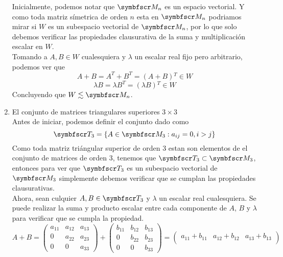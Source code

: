 \begin{enumerate}[label=\listAlph]
            Inicialmente, podemos notar que \(\fm_n\) es un espacio vectorial.
            Y como toda matriz símetrica de orden \(n\) esta en \(\fm_n\) 
            podriamos mirar si \(W\) es un subespacio vectorial de \(\fm_n\), 
            por lo que solo debemos verificar las propiedades clausurativa de la suma y multiplicación escalar en \(W\). \\
            Tomando a \(A, B \in W\) cualesquiera y \(\lambda\) un escalar real fijo pero arbitrario, podemos ver que 
            \[
                A + B = A^T + B^T = \left(A + B\right){}^T \in W
            \]
            \[
                \lambda B = \lambda B^T = \left(\lambda B\right){}^T \in W
            \]
            Concluyendo que \(W \lesssim \fm_n\).
        \item El conjunto de matrices triangulares superiores \(3 \times 3\) \\
            Antes de iniciar, podemos definir el conjunto dado como
            \[
                \ft_3 = \left\{A \in \fm_3: a_{ij} = 0, i > j\right\}
            \]
            Como toda matriz triángular superior de orden 3 estan son elementos de el conjunto de matrices de orden 3, 
            tenemos que \(\ft_3 \subset \fm_3\), entonces para ver que \(\ft_3\) es un subespacio vectorial de \(\fm_3\)
            simplemente debemos verificar que se cumplan las propiedades clausurativas.
            \\
            Ahora, sean culquier \(A, B \in \ft_3\) y \(\lambda\) un escalar real cualesquiera. 
            Se puede realizar la suma y producto escalar entre cada componente de \(A\), \(B\) y \(\lambda\) para verificar que se cumpla la propiedad.
            \[
                A + B = 
                \begin{pmatrix}
                    a_{11} & a_{12} & a_{13} \\
                    0 & a_{22} & a_{23} \\
                    0 & 0 & a_{33}
                \end{pmatrix}
                +
                \begin{pmatrix}
                    b_{11} & b_{12} & b_{13} \\
                    0 & b_{22} & b_{23} \\
                    0 & 0 & b_{33}
                \end{pmatrix}
                =
                \begin{pmatrix}
                    a_{11} + b_{11} & a_{12} + b_{12} & a_{13} + b_{13} \\

\end{pmatrix}\]
\end{enumerate}
